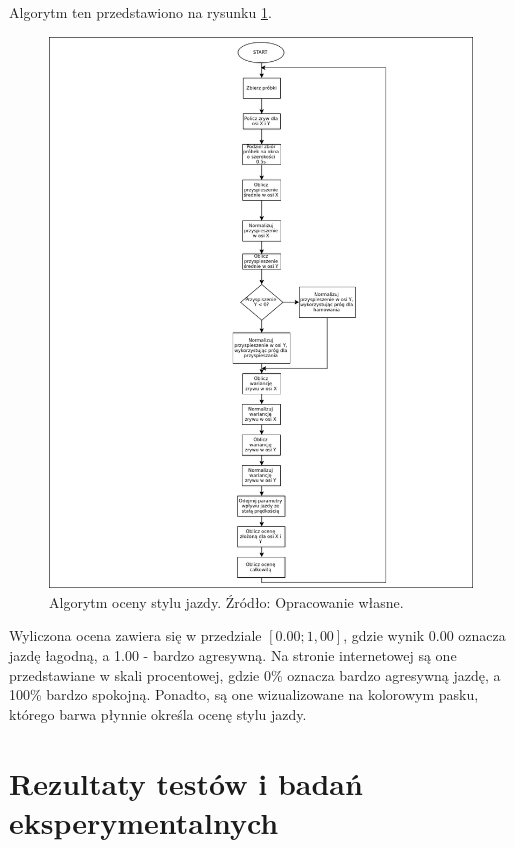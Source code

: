 Algorytm ten przedstawiono na rysunku \ref{fig:image_driving_analysis_alghoritm}.

\begin{figure}[H]
	\centering
	\includegraphics[width=15cm]{img/driving_analysis/driving_analysis.png}
	\caption{Algorytm oceny stylu jazdy. Źródło: Opracowanie własne.}
	\label{fig:image_driving_analysis_alghoritm}
\end{figure}

Wyliczona ocena zawiera się w przedziale $[0.00; 1,00]$, gdzie wynik 0.00 oznacza jazdę łagodną, a 1.00 - bardzo agresywną. Na stronie internetowej są one przedstawiane w skali procentowej, gdzie 0\% oznacza bardzo agresywną jazdę, a 100\% bardzo spokojną. Ponadto, są one wizualizowane na kolorowym pasku, którego barwa płynnie określa ocenę stylu jazdy.

\section{Rezultaty testów i badań eksperymentalnych}

